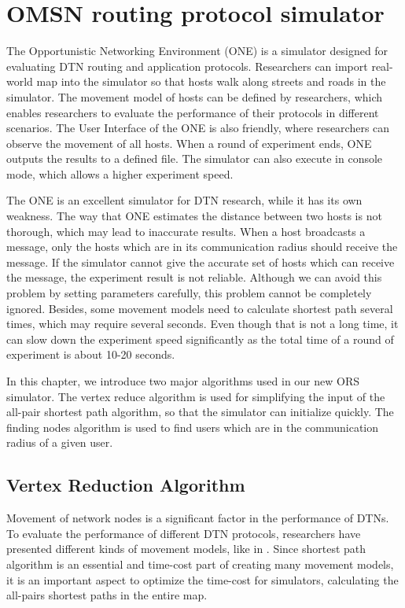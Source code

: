 


\chapter{ OMSN routing protocol simulator}
\label{OPS}

\noindent The Opportunistic Networking Environment (ONE) \cite{C35} is a simulator designed for evaluating DTN routing and application protocols. Researchers can import real-world map into the simulator so that hosts walk along streets and roads in the simulator. The movement model of hosts can be defined by researchers, which enables researchers to evaluate the performance of their protocols in different scenarios. The User Interface of the ONE is also friendly, where researchers can observe the movement of all hosts. When a round of experiment ends, ONE outputs the results to a defined file. The simulator can also execute in console mode, which allows a higher experiment speed.

The ONE is an excellent simulator for DTN research, while it has its own weakness. The way that ONE estimates the distance between two hosts is not thorough, which may lead to inaccurate results. When a host broadcasts a message, only the hosts which are in its communication radius should receive the message. If the simulator cannot give the accurate set of hosts which can receive the message, the experiment result is not reliable. Although we can avoid this problem by setting parameters carefully, this problem cannot be completely ignored. Besides, some movement models need to calculate shortest path several times, which may require several seconds. Even though that is not a long time, it can slow down the experiment speed significantly as the total time of a round of experiment is about 10-20 seconds. 

In this chapter, we introduce two major algorithms used in our new ORS simulator. The vertex reduce algorithm is used for simplifying the input of the all-pair shortest path algorithm, so that the simulator can initialize quickly. The finding nodes algorithm is used to find users which are in the communication radius of a given user.


\section{ Vertex Reduction Algorithm}

\noindent Movement of network nodes is a significant factor in the performance of DTNs. To evaluate the performance of different DTN protocols, researchers have presented different kinds of movement models, like in \cite{C32}. Since shortest path algorithm is an essential and time-cost part of creating many movement models, it is an important aspect to optimize the time-cost for simulators, calculating the all-pairs shortest paths in the entire map.

